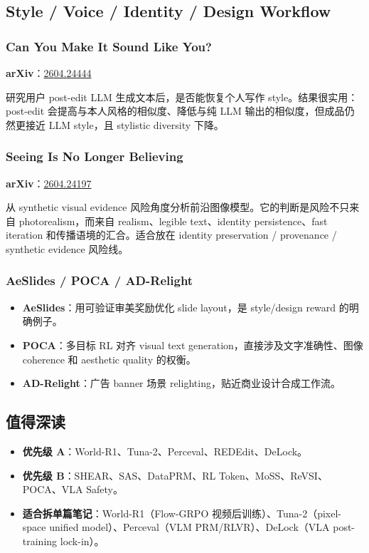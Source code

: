 \subsection{Style / Voice / Identity / Design Workflow}

\subsubsection{Can You Make It Sound Like You?}

\textbf{arXiv}：\href{https://arxiv.org/abs/2604.24444}{2604.24444}

研究用户 post-edit LLM 生成文本后，是否能恢复个人写作 style。结果很实用：post-edit 会提高与本人风格的相似度、降低与纯 LLM 输出的相似度，但成品仍然更接近 LLM style，且 stylistic diversity 下降。

\subsubsection{Seeing Is No Longer Believing}

\textbf{arXiv}：\href{https://arxiv.org/abs/2604.24197}{2604.24197}

从 synthetic visual evidence 风险角度分析前沿图像模型。它的判断是风险不只来自 photorealism，而来自 realism、legible text、identity persistence、fast iteration 和传播语境的汇合。适合放在 identity preservation / provenance / synthetic evidence 风险线。

\subsubsection{AeSlides / POCA / AD-Relight}

\begin{itemize}[leftmargin=1.5em]
  \item \textbf{AeSlides}：用可验证审美奖励优化 slide layout，是 style/design reward 的明确例子。
  \item \textbf{POCA}：多目标 RL 对齐 visual text generation，直接涉及文字准确性、图像 coherence 和 aesthetic quality 的权衡。
  \item \textbf{AD-Relight}：广告 banner 场景 relighting，贴近商业设计合成工作流。
\end{itemize}

\subsection{值得深读}

\begin{itemize}[leftmargin=1.5em]
  \item \textbf{优先级 A}：World-R1、Tuna-2、Perceval、REDEdit、DeLock。
  \item \textbf{优先级 B}：SHEAR、SAS、DataPRM、RL Token、MoSS、ReVSI、POCA、VLA Safety。
  \item \textbf{适合拆单篇笔记}：World-R1（Flow-GRPO 视频后训练）、Tuna-2（pixel-space unified model）、Perceval（VLM PRM/RLVR）、DeLock（VLA post-training lock-in）。
\end{itemize}

